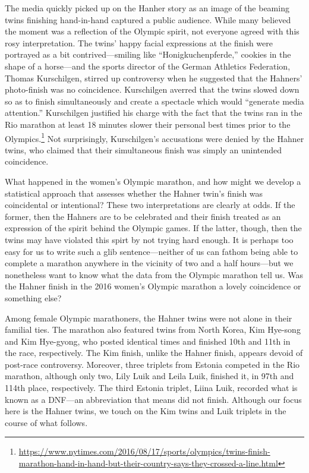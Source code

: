 \documentclass[12pt,titlepage]{article}
\begin{document}

The media quickly picked up on the Hanher story as an image of the
beaming twins finishing hand-in-hand captured a public audience. While
many believed the moment was a reflection of the Olympic spirit, not
everyone agreed with this rosy interpretation. The twins' happy facial
expressions at the finish were portrayed as a bit contrived---smiling
like ``Honigkuchenpferde,'' cookies in the shape of a horse---and the
sports director of the German Athletics Federation, Thomas
Kurschilgen, stirred up controversy when he suggested that the
Hahners' photo-finish was no coincidence.  Kurschilgen averred that
the twins slowed down so as to finish simultaneously and create a
spectacle which would ``generate media attention.'' Kurschilgen
justified his charge with the fact that the twins ran in the Rio
marathon at least 18 minutes slower their personal best times prior to
the
Olympics.\footnote{\url{https://www.nytimes.com/2016/08/17/sports/olympics/twins-finish-marathon-hand-in-hand-but-their-country-says-they-crossed-a-line.html}}
Not surprisingly, Kurschilgen's accusations were denied by the Hahner
twins, who claimed that their simultaneous finish was simply an
unintended coincidence.


What happened in the women's Olympic marathon, and how might we
develop a statistical approach that assesses whether the Hahner twin's
finish was coincidental or intentional?  These two interpretations are
clearly at odds. If the former, then the Hahners are to be celebrated
and their finish treated as an expression of the spirit behind the
Olympic games. If the latter, though, then the twins may have violated
this spirt by not trying hard enough. It is perhaps too easy for us to
write such a glib sentence---neither of us can fathom being able to
complete a marathon anywhere in the vicinity of two and a half
hours---but we nonetheless want to know what the data from the Olympic
marathon tell us.  Was the Hahner finish in the 2016 women's
Olympic marathon a lovely coincidence or something else?

Among female Olympic marathoners, the Hahner twins were not alone in
their familial ties.  The marathon also featured twins from North
Korea, Kim Hye-song and Kim Hye-gyong, who posted identical times and
finished 10th and 11th in the race, respectively. The Kim finish,
unlike the Hahner finish, appears devoid of post-race
controversy. Moreover, three triplets from Estonia competed in the Rio
marathon, although only two, Lily Luik and Leila Luik, finished it, in
97th and 114th place, respectively. The third Estonia triplet, Liina
Luik, recorded what is known as a DNF---an abbreviation that means did
not finish.  Although our focus here is the Hahner twins, we touch on
the Kim twins and Luik triplets in the course of what follows.
\end{document}
